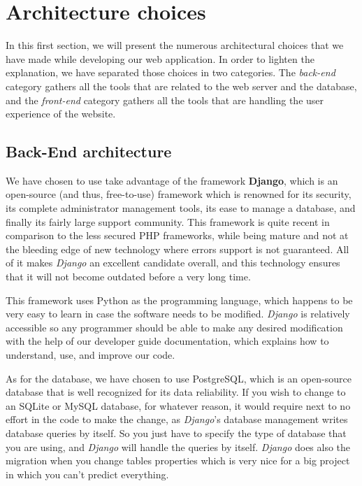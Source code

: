 \section{Architecture choices}
\label{sec:Architecture choices}

In this first section, we will present the numerous architectural choices that
we have made while developing our web application. In order to lighten the
explanation, we have separated those choices in two categories. The
\textit{back-end} category gathers all the tools that are related
to the web server and the database, and the \textit{front-end} category gathers
all the tools that are handling the user experience of the website.

\subsection{Back-End architecture}

We have chosen to use take advantage of the framework \textbf{Django}, which is
an open-source (and thus, free-to-use) framework which is renowned for its
security, its complete administrator management tools, its ease to manage a
database, and finally its fairly large support community. This framework is quite
recent in comparison to the less secured PHP frameworks, while being mature and
not at the bleeding edge of new technology where errors support is not
guaranteed. All of it makes \textit{Django} an excellent candidate overall, and
this technology ensures that it will not become outdated before a very long
time.\newline

This framework uses Python as the programming language, which happens to be
very easy to learn in case the software needs to be modified. \textit{Django}
is relatively accessible so any programmer should be able to make any desired
modification with the help of our developer guide documentation, which explains
how to understand, use, and improve our code.\newline

As for the database, we have chosen to use PostgreSQL, which is an open-source
database that is well recognized for its data reliability. If you wish to
change to an SQLite or MySQL database, for whatever reason, it would require
next to no effort in the code to make the change, as \textit{Django}'s database
management writes database queries by itself. So you just have to specify the
type of database that you are using, and \textit{Django} will handle the
queries by itself. \textit{Django} does also the migration when you change tables
properties which is very nice for a big project in which you can't predict
everything. \newline

